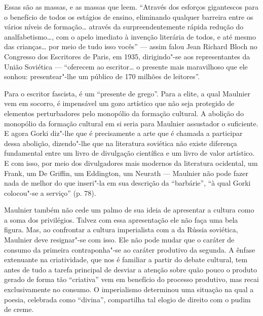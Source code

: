 Essas são as massas, e as massas que leem. ``Através dos esforços
gigantescos para o benefício de todos os estágios de ensino, eliminando
qualquer barreira entre os vários níveis de formação\ldots{} através da
surpreendentemente rápida redução do analfabetismo\ldots{}, com o apelo
imediato à invenção literária de todos, e até mesmo das crianças\ldots{} por
meio de tudo isso vocês'' --- assim falou Jean Richard Bloch no Congresso
dos Escritores de Paris, em 1935, dirigindo"-se aos representantes da
União Soviética --- ``oferecem ao escritor\ldots{} o presente mais
maravilhoso que ele sonhou: presentear"-lhe um público de 170 milhões de
leitores''.

Para o escritor fascista, é um ``presente de grego''. Para a elite, a
qual Maulnier vem em socorro, é impensável um gozo artístico que não
seja protegido de elementos perturbadores pelo monopólio da formação
cultural. A abolição do monopólio da formação cultural em si seria para
Maulnier assustador o suficiente. E agora Gorki diz"-lhe que é
precisamente a arte que é chamada a participar dessa abolição,
dizendo"-lhe que na literatura soviética não existe diferença fundamental
entre um livro de divulgação científica e um livro de valor artístico. E
com isso, por meio dos divulgadores mais modernos da literatura
ocidental, um Frank, um De Griffin, um Eddington, um Neurath --- Maulnier
não pode fazer nada de melhor do que inseri"-la em sua descrição da
``barbárie'', ``à qual Gorki colocou"-se a serviço'' (p. 78).

Maulnier também não cede um palmo de sua ideia de apresentar a cultura
como a soma dos privilégios. Talvez com essa apresentação ele não faça
uma bela figura. Mas, ao confrontar a cultura imperialista com a da
Rússia soviética, Maulnier deve resignar"-se com isso. Ele não pode mudar
que o caráter de consumo da primeira contraponha"-se ao caráter produtivo da segunda. A ênfase extenuante na criatividade, que nos é
familiar a partir do debate cultural, tem antes de tudo a tarefa
principal de desviar a atenção sobre quão pouco o produto gerado de
forma tão ``criativa'' vem em benefício do processo produtivo, mas
recai exclusivamente no consumo. O imperialismo determinou uma situação
na qual a poesia, celebrada como ``divina'', compartilha tal elogio de
direito com o pudim de creme.

